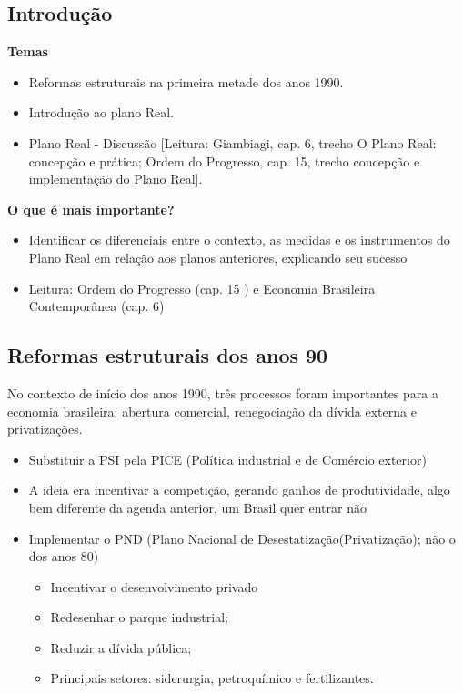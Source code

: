 \documentclass[a4paper,12pt]{article}[abntex2]
\begin{document}
\subsection{\textbf{Introdução}}

\textbf{Temas}\begin{itemize}
    \item Reformas estruturais na primeira metade dos anos 1990.
    \item Introdução ao plano Real. 
    \item Plano Real - Discussão [Leitura: Giambiagi, cap. 6, trecho O Plano Real: concepção e prática; Ordem do Progresso, cap. 15, trecho concepção e implementação do Plano Real]. 
\end{itemize}

\textbf{O que é mais importante?}\begin{itemize}
    \item Identificar os diferenciais entre o contexto, as medidas e os instrumentos do Plano Real em relação aos planos anteriores, explicando seu sucesso
    \item Leitura: Ordem do Progresso (cap. 15 ) e Economia Brasileira Contemporânea (cap. 6)
\end{itemize}

\subsection{\textbf{Reformas estruturais dos anos 90}}
No contexto de início dos anos 1990, três processos foram importantes para a economia brasileira: abertura comercial, renegociação da dívida externa e privatizações. \begin{itemize}
    \item Substituir a PSI pela PICE (Política industrial e de Comércio exterior)
    \item A ideia era incentivar a competição, gerando ganhos de produtividade, algo bem diferente da agenda anterior, um Brasil quer entrar não 
    \item Implementar o PND (Plano Nacional de Desestatização(Privatização); não o dos anos 80)\begin{itemize}
        \item Incentivar o desenvolvimento privado
        \item Redesenhar o parque industrial;
        \item Reduzir a dívida pública;
        \item Principais setores: siderurgia, petroquímico e fertilizantes.
    \end{itemize}
\end{itemize}
\end{document}
